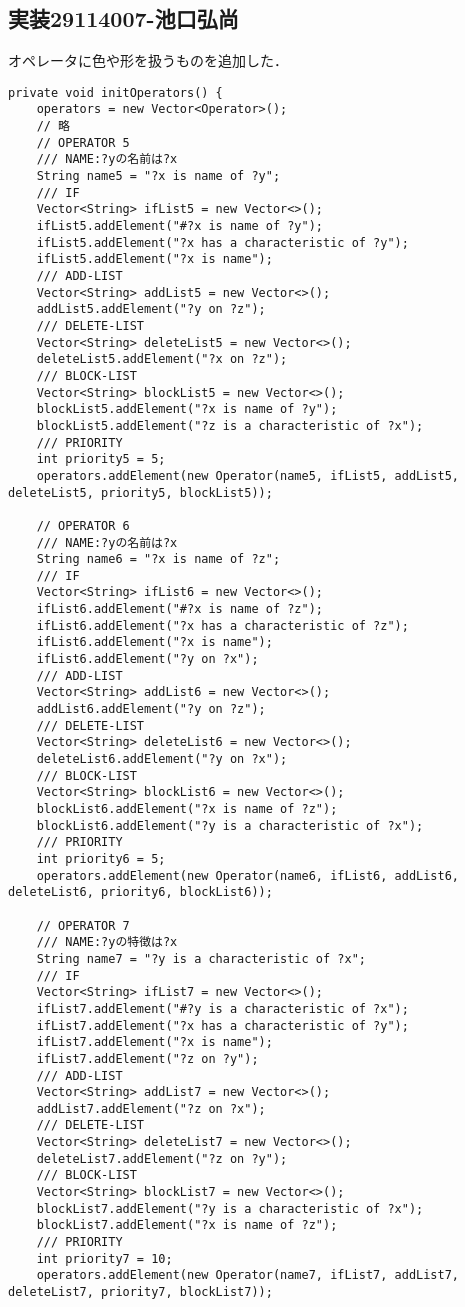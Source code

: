 \documentclass{jarticle}
\begin{document}
\subsection{実装29114007-池口弘尚}
オペレータに色や形を扱うものを追加した．
\begin{lstlisting}[caption=色や形を扱うオペレータ,label=src:operator]
private void initOperators() {
    operators = new Vector<Operator>();
    // 略
    // OPERATOR 5
    /// NAME:?yの名前は?x
    String name5 = "?x is name of ?y";
    /// IF
    Vector<String> ifList5 = new Vector<>();
    ifList5.addElement("#?x is name of ?y");
    ifList5.addElement("?x has a characteristic of ?y");
    ifList5.addElement("?x is name");
    /// ADD-LIST
    Vector<String> addList5 = new Vector<>();
    addList5.addElement("?y on ?z");
    /// DELETE-LIST
    Vector<String> deleteList5 = new Vector<>();
    deleteList5.addElement("?x on ?z");
    /// BLOCK-LIST
    Vector<String> blockList5 = new Vector<>();
    blockList5.addElement("?x is name of ?y");
    blockList5.addElement("?z is a characteristic of ?x");
    /// PRIORITY
    int priority5 = 5;
    operators.addElement(new Operator(name5, ifList5, addList5, deleteList5, priority5, blockList5));
    
    // OPERATOR 6
    /// NAME:?yの名前は?x
    String name6 = "?x is name of ?z";
    /// IF
    Vector<String> ifList6 = new Vector<>();
    ifList6.addElement("#?x is name of ?z");
    ifList6.addElement("?x has a characteristic of ?z");
    ifList6.addElement("?x is name");
    ifList6.addElement("?y on ?x");
    /// ADD-LIST
    Vector<String> addList6 = new Vector<>();
    addList6.addElement("?y on ?z");
    /// DELETE-LIST
    Vector<String> deleteList6 = new Vector<>();
    deleteList6.addElement("?y on ?x");
    /// BLOCK-LIST
    Vector<String> blockList6 = new Vector<>();
    blockList6.addElement("?x is name of ?z");
    blockList6.addElement("?y is a characteristic of ?x");
    /// PRIORITY
    int priority6 = 5;
    operators.addElement(new Operator(name6, ifList6, addList6, deleteList6, priority6, blockList6));
    
    // OPERATOR 7
    /// NAME:?yの特徴は?x
    String name7 = "?y is a characteristic of ?x";
    /// IF
    Vector<String> ifList7 = new Vector<>();
    ifList7.addElement("#?y is a characteristic of ?x");
    ifList7.addElement("?x has a characteristic of ?y");
    ifList7.addElement("?x is name");
    ifList7.addElement("?z on ?y");
    /// ADD-LIST
    Vector<String> addList7 = new Vector<>();
    addList7.addElement("?z on ?x");
    /// DELETE-LIST
    Vector<String> deleteList7 = new Vector<>();
    deleteList7.addElement("?z on ?y");
    /// BLOCK-LIST
    Vector<String> blockList7 = new Vector<>();
    blockList7.addElement("?y is a characteristic of ?x");
    blockList7.addElement("?x is name of ?z");
    /// PRIORITY
    int priority7 = 10;
    operators.addElement(new Operator(name7, ifList7, addList7, deleteList7, priority7, blockList7));
    

\end{lstlisting}
\end{document}
